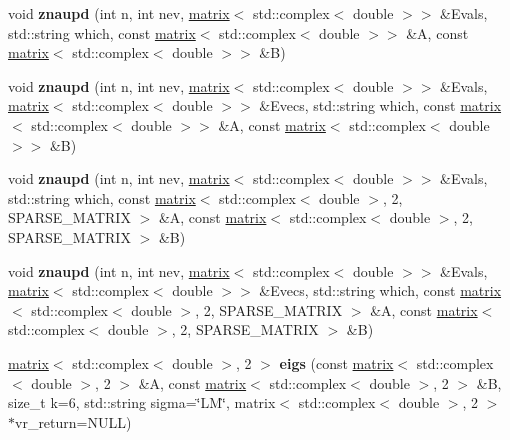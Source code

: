 \begin{DoxyCompactItemize}
\item 
\hypertarget{namespacekeycpp_a3a48586ae7aa9b525ec4c95eb2a3bf60}{void {\bfseries znaupd} (int n, int nev, \hyperlink{classkeycpp_1_1matrix}{matrix}$<$ std\-::complex$<$ double $>$$>$ \&Evals, std\-::string which, const \hyperlink{classkeycpp_1_1matrix}{matrix}$<$ std\-::complex$<$ double $>$$>$ \&A, const \hyperlink{classkeycpp_1_1matrix}{matrix}$<$ std\-::complex$<$ double $>$$>$ \&B)}\label{namespacekeycpp_a3a48586ae7aa9b525ec4c95eb2a3bf60}

\item 
\hypertarget{namespacekeycpp_af636d0e1783e6db55988978301448baf}{void {\bfseries znaupd} (int n, int nev, \hyperlink{classkeycpp_1_1matrix}{matrix}$<$ std\-::complex$<$ double $>$$>$ \&Evals, \hyperlink{classkeycpp_1_1matrix}{matrix}$<$ std\-::complex$<$ double $>$$>$ \&Evecs, std\-::string which, const \hyperlink{classkeycpp_1_1matrix}{matrix}$<$ std\-::complex$<$ double $>$$>$ \&A, const \hyperlink{classkeycpp_1_1matrix}{matrix}$<$ std\-::complex$<$ double $>$$>$ \&B)}\label{namespacekeycpp_af636d0e1783e6db55988978301448baf}

\item 
\hypertarget{namespacekeycpp_a0969cbc503faaa741d3482e8285ca976}{void {\bfseries znaupd} (int n, int nev, \hyperlink{classkeycpp_1_1matrix}{matrix}$<$ std\-::complex$<$ double $>$$>$ \&Evals, std\-::string which, const \hyperlink{classkeycpp_1_1matrix}{matrix}$<$ std\-::complex$<$ double $>$, 2, S\-P\-A\-R\-S\-E\-\_\-\-M\-A\-T\-R\-I\-X $>$ \&A, const \hyperlink{classkeycpp_1_1matrix}{matrix}$<$ std\-::complex$<$ double $>$, 2, S\-P\-A\-R\-S\-E\-\_\-\-M\-A\-T\-R\-I\-X $>$ \&B)}\label{namespacekeycpp_a0969cbc503faaa741d3482e8285ca976}

\item 
\hypertarget{namespacekeycpp_ad462e40814478e9b094e72b83ddf0d88}{void {\bfseries znaupd} (int n, int nev, \hyperlink{classkeycpp_1_1matrix}{matrix}$<$ std\-::complex$<$ double $>$$>$ \&Evals, \hyperlink{classkeycpp_1_1matrix}{matrix}$<$ std\-::complex$<$ double $>$$>$ \&Evecs, std\-::string which, const \hyperlink{classkeycpp_1_1matrix}{matrix}$<$ std\-::complex$<$ double $>$, 2, S\-P\-A\-R\-S\-E\-\_\-\-M\-A\-T\-R\-I\-X $>$ \&A, const \hyperlink{classkeycpp_1_1matrix}{matrix}$<$ std\-::complex$<$ double $>$, 2, S\-P\-A\-R\-S\-E\-\_\-\-M\-A\-T\-R\-I\-X $>$ \&B)}\label{namespacekeycpp_ad462e40814478e9b094e72b83ddf0d88}

\item 
\hypertarget{namespacekeycpp_ac5afa37bc07eb8bb1fb04d44ba32d458}{\hyperlink{classkeycpp_1_1matrix}{matrix}$<$ std\-::complex$<$ double $>$, 2 $>$ {\bfseries eigs} (const \hyperlink{classkeycpp_1_1matrix}{matrix}$<$ std\-::complex$<$ double $>$, 2 $>$ \&A, const \hyperlink{classkeycpp_1_1matrix}{matrix}$<$ std\-::complex$<$ double $>$, 2 $>$ \&B, size\-\_\-t k=6, std\-::string sigma=\char`\"{}L\-M\char`\"{}, matrix$<$ std\-::complex$<$ double $>$, 2 $>$ $\ast$vr\-\_\-return=N\-U\-L\-L)}\label{namespacekeycpp_ac5afa37bc07eb8bb1fb04d44ba32d458}


\end{DoxyCompactItemize}
